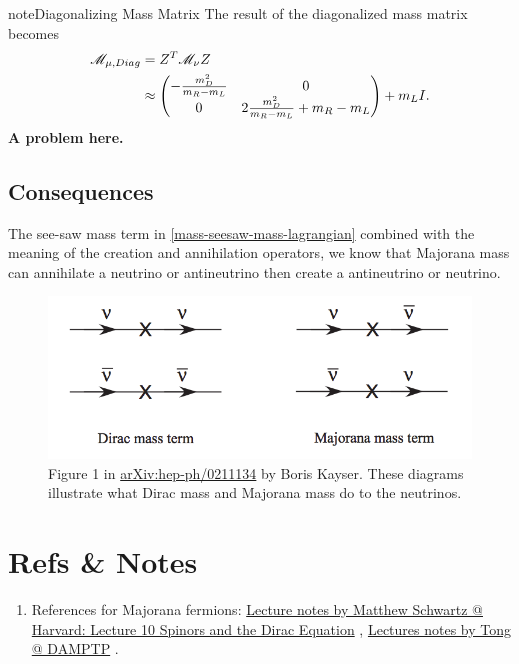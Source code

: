 \documentclass[letterpaper,12pt,english]{sphinxmanual}
\begin{document}
\begin{notice}{note}{Diagonalizing Mass Matrix}
The result of the diagonalized mass matrix becomes
\begin{gather}
\begin{split}\mathscr{M}_{\mu,Diag} &= Z^T \mathscr{M}_\nu Z \\
& \approx \begin{pmatrix}  -\frac{m_D^2}{m_R-m_L} & 0 \\  0 & 2\frac{m_D^2}{m_R-m_L}+ m_R-m_L  \end{pmatrix} + m_L I.\end{split}\notag
\end{gather}
\textbf{A problem here.}
\end{notice}


\subsection{Consequences}
\label{mass:consequences}
The see-saw mass term in \eqref{mass-seesaw-mass-lagrangian} combined with the meaning of the creation and annihilation operators, we know that Majorana mass can annihilate a neutrino or antineutrino then create a antineutrino or neutrino.
\begin{figure}[htbp]
\centering
\capstart

\includegraphics{dirac-mass-vs-majorana-mass-lines.png}
\caption{Figure 1 in \href{http://arxiv.org/abs/hep-ph/0211134}{arXiv:hep-ph/0211134} by Boris Kayser. These diagrams illustrate what Dirac mass and Majorana mass do to the neutrinos.}\end{figure}


\section{Refs \& Notes}
\label{mass:refs-notes}\begin{enumerate}
\item {} 
References for Majorana fermions: \href{http://isites.harvard.edu/fs/docs/icb.topic792163.files/10-spinors.pdf}{Lecture notes by Matthew Schwartz @ Harvard: Lecture 10 Spinors and the Dirac Equation} , \href{http://www.damtp.cam.ac.uk/user/tong/qft/four.pdf}{Lectures notes by Tong @ DAMPTP} .

\end{enumerate}
\end{document}

